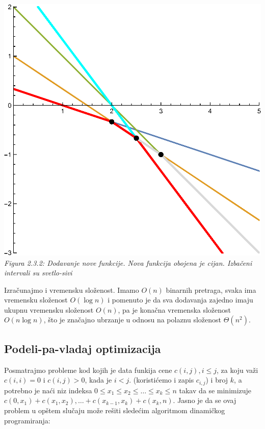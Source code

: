 \documentclass[a4paper,12pt]{article}
\numberwithin{equation}{subsection}
\begin{document}
\begin{center}
\includegraphics[scale=0.7]{2-3-2.eps}
\\
\textit{Figura 2.3.2: Dodavanje nove funkcije. Nova funkcija obojena je cijan. Izba\v ceni intervali su svetlo-sivi}
\end{center}

Izra\v cunajmo i vremensku slo\v zenost. Imamo $O(n)$ binarnih pretraga, svaka ima vremensku slo\v zenost $O(\log n)$ i pomenuto je da sva dodavanja zajedno imaju ukupnu vremensku slo\v zenost $O(n)$, pa je kona\v cna vremenska slo\v zenost $O(n \log n)$, \v sto je zna\v cajno ubrzanje u odnosu na polaznu slo\v zenost $\Theta(n^2)$.

\subsection{Podeli-pa-vladaj optimizacija}

Posmatrajmo probleme kod kojih je data funkija cene $c(i, j), i \leq j$, za koju va\v zi $c(i,i)=0$ i $c(i, j) > 0$, kada je $i<j$. (koristi\' cemo i zapis $c_{i,j}$) i broj $k$, a potrebno je na\' ci niz indeksa $0 \leq x_1 \leq x_2 \leq \ldots \leq x_k \leq n$ takav da se minimizuje $c(0, x_1) + c(x_1, x_2), \ldots + c(x_{k-1}, x_k) + c(x_k, n)$. Jasno je da se ovaj problem u op\v stem slu\v caju mo\v ze re\v siti slede\' cim algoritmom dinami\v ckog programiranja:
\\
\end{document}
